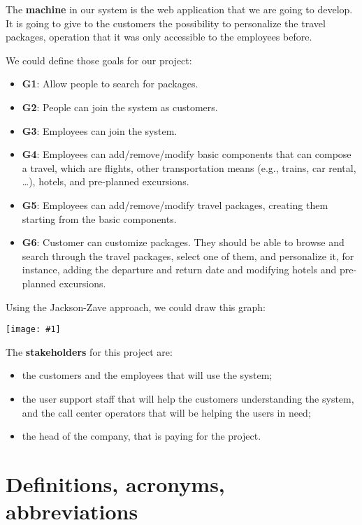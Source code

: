 \documentclass[a4paper,12pt]{book}
\newcommand{\putimg}[2]{
  \begin{center}
    \texttt{[image: \#1]}
  \end{center}
}
\begin{document}
The \textbf{machine} in our system is the web application that we are going to develop. It is going to give to the customers the possibility to personalize the travel packages, operation that it was only accessible to the employees before.\newline

We could define those goals for our project:
\begin{itemize}
  \item \textbf{G1}: Allow people to search for packages.
  \item \textbf{G2}: People can join the system as customers.
  \item \textbf{G3}: Employees can join the system.
  \item \textbf{G4}: Employees can add/remove/modify basic components that can compose a travel, which are flights, other transportation means (e.g., trains, car rental, \dots), hotels, and pre-planned excursions.
  \item \textbf{G5}: Employees can add/remove/modify travel packages, creating them starting from the basic components.
  \item \textbf{G6}: Customer can customize packages. They should be able to browse and search through the travel packages, select one of them, and personalize it, for instance, adding the departure and return date and modifying hotels and pre-planned excursions.
\end{itemize}

Using the Jackson-Zave approach, we could draw this graph:
\putimg{jackson-zave}{0.3}

The \textbf{stakeholders} for this project are:
\begin{itemize}
  \item the customers and the employees that will use the system;
  \item the user support staff that will help the customers understanding the system, and the call center operators that will be helping the users in need;
  \item the head of the company, that is paying for the project.
\end{itemize}

\section{Definitions, acronyms, abbreviations}
\end{document}
